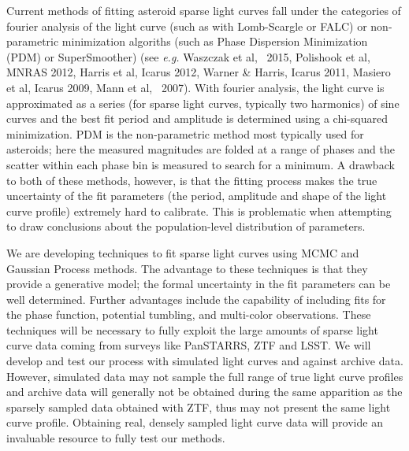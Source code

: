 \documentclass[11pt]{article}
\begin{document}
Current methods of fitting asteroid sparse light curves fall under the categories of
fourier analysis of the light curve (such as with Lomb-Scargle or FALC) or non-parametric
minimization algoriths (such as Phase Dispersion Minimization (PDM) or SuperSmoother)  
(see {\it e.g.} Waszczak et al, \aj\, 2015, Polishook et al,
MNRAS 2012, Harris et al, Icarus 2012, Warner \& Harris, Icarus 2011,
Masiero et al, Icarus 2009, Mann et al, \aj\, 2007).  With fourier analysis, the 
light curve is approximated as a series (for sparse light curves, typically two harmonics)
of sine curves and the best fit period and amplitude is determined using a chi-squared minimization. 
PDM is the non-parametric method most typically used for asteroids; here the measured magnitudes
are folded at a range of phases and the scatter within each phase bin is measured to search for 
a minimum. A drawback to both of these methods, however, is that the fitting process makes the true 
uncertainty of the fit parameters (the period, amplitude and shape of the light curve profile) extremely hard
to calibrate. This is problematic when attempting to draw conclusions about the population-level distribution
of parameters.

We are developing techniques to fit sparse light curves using MCMC and Gaussian Process
methods. The advantage to these techniques is that they provide a generative model;
the formal uncertainty in the fit parameters can be well determined. Further advantages
include the capability of including fits for the phase function, potential tumbling, 
and multi-color observations. These techniques will be necessary to fully
exploit the large amounts of sparse light curve data coming from surveys like
PanSTARRS, ZTF and LSST. We will develop and test our process with simulated light curves and against 
archive data. However, simulated data may not sample the full range
of true light curve profiles and archive data will generally not be obtained
during the same apparition as the sparsely sampled data obtained with ZTF, thus may
not present the same light curve profile. Obtaining real, densely sampled
light curve data will provide an invaluable resource to fully test our methods.


\clearpage

\end{document}
